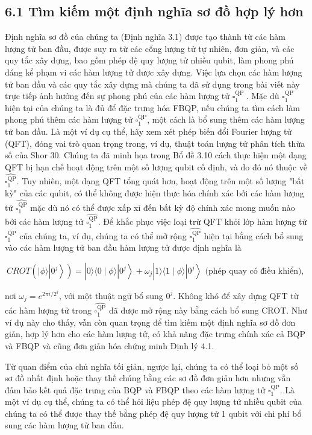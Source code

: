 \documentclass[10pt]{article}
\begin{document}
\begin{enumerate}
\subsection*{6.1 Tìm kiếm một định nghĩa sơ đồ hợp lý hơn}
Định nghĩa sơ đồ của chúng ta (Định nghĩa 3.1) được tạo thành từ các hàm lượng tử ban đầu, được suy ra từ các cổng lượng tử tự nhiên, đơn giản, và các quy tắc xây dựng, bao gồm phép đệ quy lượng tử nhiều qubit, làm phong phú đáng kể phạm vi các hàm lượng tử được xây dựng. Việc lựa chọn các hàm lượng tử ban đầu và các quy tắc xây dựng mà chúng ta đã sử dụng trong bài viết này trực tiếp ảnh hưởng đến sự phong phú của các hàm lượng tử $\square_{1}^{\text {QP }}$. Mặc dù $\square_{1}^{\mathrm{QP}}$ hiện tại của chúng ta là đủ để đặc trưng hóa FBQP, nếu chúng ta tìm cách làm phong phú thêm các hàm lượng tử $\square_{1}^{\mathrm{QP}}$, một cách là bổ sung thêm các hàm lượng tử ban đầu. Là một ví dụ cụ thể, hãy xem xét phép biến đổi Fourier lượng tử (QFT), đóng vai trò quan trọng trong, ví dụ, thuật toán lượng tử phân tích thừa số của Shor 30. Chúng ta đã minh họa trong Bổ đề 3.10 cách thực hiện một dạng QFT bị hạn chế hoạt động trên một số lượng qubit cố định, và do đó nó thuộc về $\widehat{\square_{1}^{\mathrm{QP}}}$. Tuy nhiên, một dạng QFT tổng quát hơn, hoạt động trên một số lượng "bất kỳ" của các qubit, có thể không được hiện thực hóa chính xác bởi các hàm lượng tử $\widehat{\square_{1}^{\mathrm{QP}}}$ mặc dù nó có thể được xấp xỉ đến bất kỳ độ chính xác mong muốn nào bởi các hàm lượng tử $\widehat{\square_{1}^{\mathrm{QP}}}$. Để khắc phục việc loại trừ QFT khỏi lớp hàm lượng tử $\square_{1}^{\mathrm{QP}}$ của chúng ta, ví dụ, chúng ta có thể mở rộng $\widehat{\square_{1}^{\mathrm{QP}}}$ hiện tại bằng cách bổ sung vào các hàm lượng tử ban đầu hàm lượng tử được định nghĩa là

$$
C R O T\left(|\phi\rangle\left|0^{j}\right\rangle\right)=|0\rangle\langle 0 \mid \phi\rangle\left|0^{j}\right\rangle+\omega_{j}|1\rangle\langle 1 \mid \phi\rangle\left|0^{j}\right\rangle \text { (phép quay có điều khiển), }
$$

nơi $\omega_{j}=e^{2 \pi i / 2^{j}}$, với một thuật ngữ bổ sung $0^{j}$. Không khó để xây dựng QFT từ các hàm lượng tử trong $\widehat{\square_{1}^{\mathrm{QP}}}$ đã được mở rộng này bằng cách bổ sung CROT. Như ví dụ này cho thấy, vẫn còn quan trọng để tìm kiếm một định nghĩa sơ đồ đơn giản, hợp lý hơn cho các hàm lượng tử, có khả năng đặc trưng chính xác cả BQP và FBQP và cũng đơn giản hóa chứng minh Định lý 4.1.

Từ quan điểm của chủ nghĩa tối giản, ngược lại, chúng ta có thể loại bỏ một số sơ đồ nhất định hoặc thay thế chúng bằng các sơ đồ đơn giản hơn nhưng vẫn đảm bảo kết quả đặc trưng của BQP và FBQP theo các hàm lượng tử $\square_{1}^{\mathrm{QP}}$. Là một ví dụ cụ thể, chúng ta có thể hỏi liệu phép đệ quy lượng tử nhiều qubit của chúng ta có thể được thay thế bằng phép đệ quy lượng tử 1 qubit với chi phí bổ sung các hàm lượng tử ban đầu.


\end{enumerate}
\end{document}
